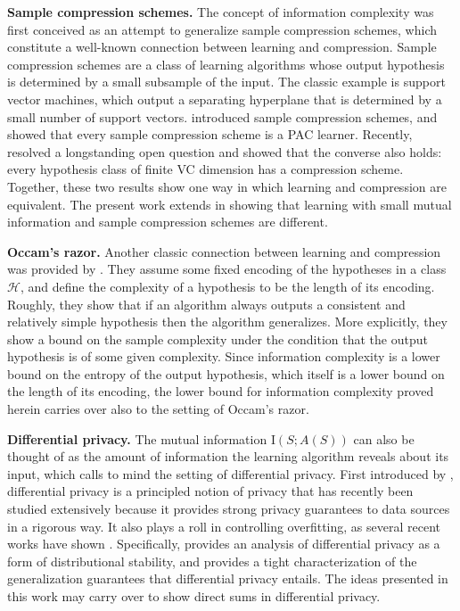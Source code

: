 \documentclass[final,12pt]{colt2018}
\newcommand{\mc}[1]{\mathcal{#1}}
\newcommand{\cH}{\mc{H}}
\newcommand{\II}[1]{\mathrm{I}\left(#1\right)}
\begin{document}
\textbf{Sample compression schemes.} The concept of information complexity was first conceived as an attempt to generalize sample compression schemes, which constitute a well-known connection between learning and compression. Sample compression schemes are a class of learning algorithms whose output hypothesis is determined by a small subsample of the input. The classic example is support vector machines, which output a separating hyperplane that is determined by a small number of support vectors. \cite{littlestone1986relating} introduced sample compression schemes, and showed that every sample compression scheme is a PAC learner. Recently, \cite{moran2016sample} resolved a longstanding open question and showed that the converse also holds: every hypothesis class of finite VC dimension has a compression scheme. Together, these two results show one way in which learning and compression are equivalent. The present work extends \cite{bassily2018learners} in showing that learning with small mutual information and sample compression schemes are different.


\textbf{Occam's razor.} Another classic connection between learning and compression was provided by \cite{blumer1987occam}. They assume some fixed encoding of the hypotheses in a class $\cH$, and define the complexity of a hypothesis to be the length of its encoding. Roughly, they show that if an algorithm always outputs a consistent and relatively simple hypothesis then the algorithm 
generalizes. More explicitly, they show a bound on the sample complexity under the condition that the output hypothesis is of some given complexity. 
Since information complexity is a lower bound on the entropy of the output hypothesis, which itself is a lower bound on the length of its encoding, the lower bound for information complexity proved herein carries over also to the setting of Occam's razor.

\textbf{Differential privacy.} 
The mutual information $\II{S;A(S)}$ can also be thought of as the amount of information the learning algorithm reveals about its input, which calls to mind the setting of differential privacy. First introduced by \cite{dwork2006calibrating}, differential privacy is a principled notion of privacy that has recently been studied extensively because it provides strong privacy guarantees to data sources in a rigorous way. It also plays a roll in controlling overfitting, as several recent works  have shown \cite[e.g.][]{dwork2015preserving, bassily2016algorithmic, rogers2016max, bassily2014private}. Specifically, \cite{bassily2016algorithmic} provides an analysis of differential privacy as a form of distributional stability, and provides a tight characterization of the generalization guarantees that differential privacy entails.
The ideas presented in this work
may carry over to show direct sums in differential privacy.
\end{document}
